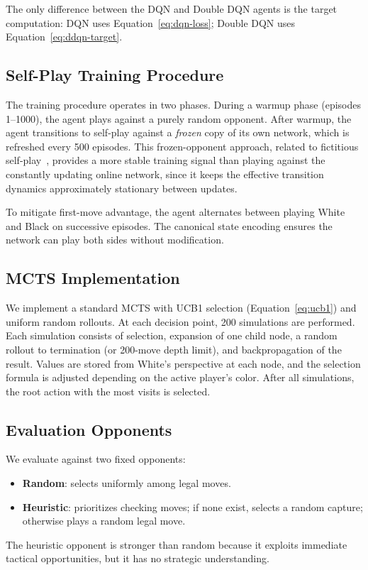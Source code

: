 \documentclass[letterpaper]{article}
\begin{document}
The only difference between the DQN and Double DQN agents is the target computation: DQN uses Equation~\ref{eq:dqn-loss}; Double DQN uses Equation~\ref{eq:ddqn-target}.

\subsection{Self-Play Training Procedure}

The training procedure operates in two phases.
During a warmup phase (episodes 1--1000), the agent plays against a purely random opponent.
After warmup, the agent transitions to self-play against a \emph{frozen} copy of its own network, which is refreshed every 500 episodes.
This frozen-opponent approach, related to fictitious self-play~\cite{heinrich2016}, provides a more stable training signal than playing against the constantly updating online network, since it keeps the effective transition dynamics approximately stationary between updates.

To mitigate first-move advantage, the agent alternates between playing White and Black on successive episodes.
The canonical state encoding ensures the network can play both sides without modification.

\subsection{MCTS Implementation}

We implement a standard MCTS with UCB1 selection (Equation~\ref{eq:ucb1}) and uniform random rollouts.
At each decision point, 200 simulations are performed.
Each simulation consists of selection, expansion of one child node, a random rollout to termination (or 200-move depth limit), and backpropagation of the result.
Values are stored from White's perspective at each node, and the selection formula is adjusted depending on the active player's color.
After all simulations, the root action with the most visits is selected.

\subsection{Evaluation Opponents}

We evaluate against two fixed opponents:
\begin{itemize}
    \item \textbf{Random}: selects uniformly among legal moves.
    \item \textbf{Heuristic}: prioritizes checking moves; if none exist, selects a random capture; otherwise plays a random legal move.
\end{itemize}
The heuristic opponent is stronger than random because it exploits immediate tactical opportunities, but it has no strategic understanding.
\end{document}

